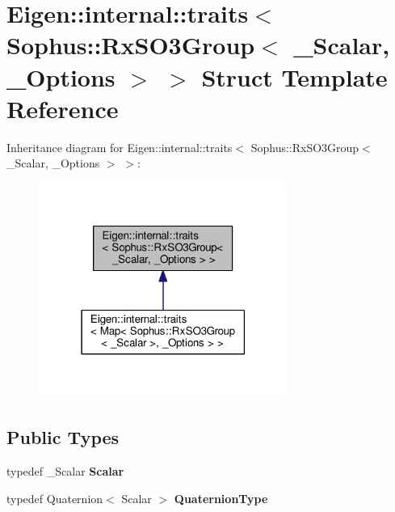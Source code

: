 \hypertarget{struct_eigen_1_1internal_1_1traits_3_01_sophus_1_1_rx_s_o3_group_3_01___scalar_00_01___options_01_4_01_4}{}\section{Eigen\+:\+:internal\+:\+:traits$<$ Sophus\+:\+:Rx\+S\+O3\+Group$<$ \+\_\+\+Scalar, \+\_\+\+Options $>$ $>$ Struct Template Reference}
\label{struct_eigen_1_1internal_1_1traits_3_01_sophus_1_1_rx_s_o3_group_3_01___scalar_00_01___options_01_4_01_4}


Inheritance diagram for Eigen\+:\+:internal\+:\+:traits$<$ Sophus\+:\+:Rx\+S\+O3\+Group$<$ \+\_\+\+Scalar, \+\_\+\+Options $>$ $>$\+:
\nopagebreak
\begin{figure}[H]
\begin{center}
\leavevmode
\includegraphics[width=231pt]{struct_eigen_1_1internal_1_1traits_3_01_sophus_1_1_rx_s_o3_group_3_01___scalar_00_01___options_01_4_01_4__inherit__graph}
\end{center}
\end{figure}
\subsection*{Public Types}
\begin{DoxyCompactItemize}
\item 
typedef \+\_\+\+Scalar {\bfseries Scalar}\hypertarget{struct_eigen_1_1internal_1_1traits_3_01_sophus_1_1_rx_s_o3_group_3_01___scalar_00_01___options_01_4_01_4_a0e0d77361db8041b68303f4da97c6309}{}\label{struct_eigen_1_1internal_1_1traits_3_01_sophus_1_1_rx_s_o3_group_3_01___scalar_00_01___options_01_4_01_4_a0e0d77361db8041b68303f4da97c6309}

\item 
typedef Quaternion$<$ Scalar $>$ {\bfseries Quaternion\+Type}\hypertarget{struct_eigen_1_1internal_1_1traits_3_01_sophus_1_1_rx_s_o3_group_3_01___scalar_00_01___options_01_4_01_4_ab699bd038a65bf712da4d899b90738e0}{}\label{struct_eigen_1_1internal_1_1traits_3_01_sophus_1_1_rx_s_o3_group_3_01___scalar_00_01___options_01_4_01_4_ab699bd038a65bf712da4d899b90738e0}

\end{DoxyCompactItemize}


